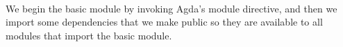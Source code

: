 \documentclass[sigplan,screen]{acmart}
\begin{document}
\begin{code}%
\>[0]\AgdaSymbol{\{-\#}\AgdaSpace{}%
\AgdaSpace{}%
\AgdaSpace{}%
\AgdaSpace{}%
\AgdaSpace{}%
\AgdaSymbol{\#-\}}\<%
\\
\>[0]\<%
\end{code}

We begin the basic module by invoking Agda's module directive, and then we import some dependencies that we make public so they are available to all modules that import the basic module.

\begin{code}%
\>[0]\AgdaSpace{}%
\AgdaSpace{}%
\<%
\\
%
\\[\AgdaEmptyExtraSkip]%
\>[0]\AgdaSpace{}%
\AgdaSpace{}%
\AgdaSpace{}%
\AgdaSpace{}%
\AgdaSymbol{(}\AgdaSymbol{;}\AgdaSpace{}%
\AgdaSymbol{;}\AgdaSpace{}%
\AgdaSymbol{;}\AgdaSpace{}%
\AgdaSymbol{;}\AgdaSpace{}%
\AgdaSymbol{;}\AgdaSpace{}%
\AgdaSymbol{;}\<%
\\
\>[0][@{}l@{\AgdaIndent{0}}]%
\>[2]\AgdaSymbol{;}\AgdaSpace{}%
\AgdaSymbol{;}\AgdaSymbol{;}\AgdaSpace{}%
\AgdaOperator{\AgdaInductiveConstructor{\AgdaUnderscore{},\AgdaUnderscore{}}}\AgdaSymbol{;}\AgdaSpace{}%
\AgdaSymbol{;}\AgdaSpace{}%
\AgdaSymbol{;}\AgdaSpace{}%
\AgdaSymbol{;}\AgdaSpace{}%
\AgdaSymbol{;}\AgdaSpace{}%
\AgdaSymbol{;}\AgdaSpace{}%
\AgdaSymbol{;}\AgdaSpace{}%
\AgdaSymbol{;}\AgdaSpace{}%
\AgdaSymbol{;}\<%
\\
%
\>[2]\AgdaSymbol{;}\AgdaSpace{}%
\AgdaSymbol{)}\AgdaSpace{}%
\<%
\end{code}
\end{document}
